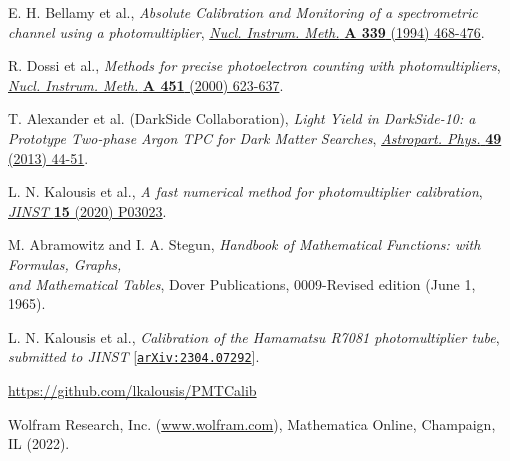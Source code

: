 \documentclass[a4paper,11pt]{article}
\begin{document}
\begin{thebibliography}{99}

 E. H. Bellamy {et al.}, \emph{Absolute Calibration and Monitoring of a spectrometric channel using a photomultiplier}, 
\href{https://www.sciencedirect.com/science/article/pii/016890029490183X}{\emph{Nucl. Instrum. Meth.} {\bf A 339} (1994) 468-476}. 

  R. Dossi {et al.}, \emph{Methods for precise photoelectron counting with photomultipliers}, 
\href{https://www.sciencedirect.com/science/article/pii/S0168900200003375}{\emph{Nucl. Instrum. Meth.} {\bf A 451} (2000) 623-637}.

 T. Alexander {et al.} (DarkSide Collaboration), \emph{Light Yield in DarkSide-10: a Prototype Two-phase Argon TPC for Dark Matter Searches}, 
\href{https://www.sciencedirect.com/science/article/pii/S0927650513001254?via\%3Dihub}{\emph{Astropart. Phys.} {\bf 49} (2013) 44-51}.

 L. N. Kalousis {et al.}, \emph{A fast numerical method for photomultiplier calibration},\\  
\href{https://iopscience.iop.org/article/10.1088/1748-0221/15/03/P03023}{\emph{JINST} {\bf 15} (2020) P03023}.

 M. Abramowitz and I. A. Stegun, \emph{Handbook of Mathematical Functions: with Formulas, Graphs, \\ and Mathematical Tables}, Dover Publications, 0009-Revised edition (June 1, 1965).  


 L. N. Kalousis {et al.}, \emph{Calibration of the Hamamatsu R7081 photomultiplier tube}, \\ \emph{submitted to JINST} 
[\href{https://arxiv.org/abs/2304.07292}{\texttt{arXiv:2304.07292}}]. 

 \href{https://github.com/lkalousis/PMTCalib}{https://github.com/lkalousis/PMTCalib}

 Wolfram Research, Inc. (\href{www.wolfram.com}{www.wolfram.com}), Mathematica Online, Champaign, IL (2022).

\end{thebibliography}
\end{document}
